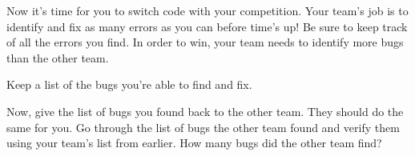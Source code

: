 \vspace{5cm}

\begin{multipart}
Now it’s time for you to switch code with your competition. Your team’s job is to identify and fix as many errors as you can before time’s up! Be sure to keep track of all the errors you find. In order to win, your team needs to identify more bugs than the other team.

Keep a list of the bugs you’re able to find and fix.
\end{multipart}

\vspace{5cm}

\begin{multipart}
Now, give the list of bugs you found back to the other team. They should do the same for you. Go through the list of bugs the other team found and verify them using your team’s list from earlier. How many bugs did the other team find?
\end{multipart}
